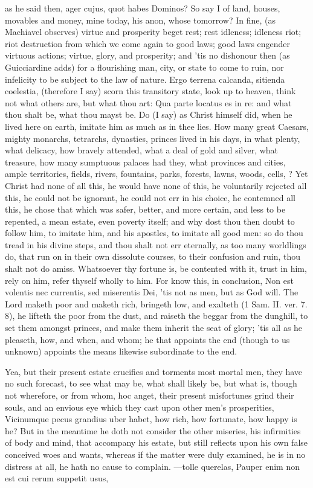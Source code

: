 {as he said then, ager cujus, quot habes Dominos? So say I of land,
houses, movables and money, mine today, his anon, whose tomorrow? In
fine, (as Machiavel observes) virtue and prosperity beget rest;
rest idleness; idleness riot; riot destruction from which we come again
to good laws; good laws engender virtuous actions; virtue, glory, and
prosperity; and 'tis no dishonour then (as Guicciardine adds) for a
flourishing man, city, or state to come to ruin, nor infelicity
to be subject to the law of nature. Ergo terrena calcanda, sitienda
coelestia, (therefore I say) scorn this transitory state, look up to
heaven, think not what others are, but what thou art: Qua parte
locatus es in re: and what thou shalt be, what thou mayst be. Do (I
say) as Christ himself did, when he lived here on earth, imitate him as
much as in thee lies. How many great Caesars, mighty monarchs,
tetrarchs, dynasties, princes lived in his days, in what plenty, what
delicacy, how bravely attended, what a deal of gold and silver, what
treasure, how many sumptuous palaces had they, what provinces and
cities, ample territories, fields, rivers, fountains, parks, forests,
lawns, woods, cells, \etc{}? Yet Christ had none of all this, he would
have none of this, he voluntarily rejected all this, he could not be
ignorant, he could not err in his choice, he contemned all this, he
chose that which was safer, better, and more certain, and less to be
repented, a mean estate, even poverty itself; and why dost thou then
doubt to follow him, to imitate him, and his apostles, to imitate all
good men: so do thou tread in his divine steps, and thou shalt not err
eternally, as too many worldlings do, that run on in their own
dissolute courses, to their confusion and ruin, thou shalt not do
amiss. Whatsoever thy fortune is, be contented with it, trust in him,
rely on him, refer thyself wholly to him. For know this, in conclusion,
Non est volentis nec currentis, sed miserentis Dei, 'tis not as men,
but as God will. The Lord maketh poor and maketh rich, bringeth low,
and exalteth (1 Sam. II. ver. 7. 8), he lifteth the poor from the dust,
and raiseth the beggar from the dunghill, to set them amongst princes,
and make them inherit the seat of glory; 'tis all as he pleaseth, how,
and when, and whom; he that appoints the end (though to us unknown)
appoints the means likewise subordinate to the end.

Yea, but their present estate crucifies and torments most mortal men,
they have no such forecast, to see what may be, what shall likely be,
but what is, though not wherefore, or from whom, hoc anget, their
present misfortunes grind their souls, and an envious eye which they
cast upon other men's prosperities, Vicinumque pecus grandius uber
habet, how rich, how fortunate, how happy is he? But in the meantime he
doth not consider the other miseries, his infirmities of body and mind,
that accompany his estate, but still reflects upon his own false
conceived woes and wants, whereas if the matter were duly examined,
he is in no distress at all, he hath no cause to complain.
---tolle querelas,
Pauper enim non est cui rerum suppetit usus,

}
